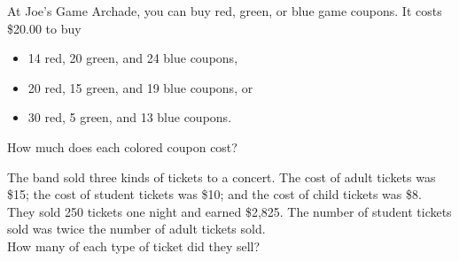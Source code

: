 \myWideProblemWithContent
{
At Joe's Game Archade,
you can buy red, green, or blue game coupons.
It costs \$20.00 to buy
\begin{itemize}[nosep]
  \item 14 red, 20 green, and 24 blue coupons,
  \item 20 red, 15 green, and 19 blue coupons, or 
  \item 30 red, 5 green, and 13 blue coupons. 
\end{itemize}
How much does each colored coupon cost?
\begin{center}
  \mySystemTable[10][4]
\end{center}
}

\vfil

\myWideProblemWithContent
{
  The band sold three kinds of tickets to a concert. 
  The cost of adult tickets was \$15; 
  the cost of student tickets was \$10; and
  the cost of child tickets was \$8. 
  They sold 250 tickets one night 
  and earned \$2,825.
  The number of student tickets sold was twice the number of adult tickets sold. 
  \\[1\onelineskip]
  How many of each type of ticket did they sell?
\begin{center}
  \mySystemTable[10][4]
\end{center}
}